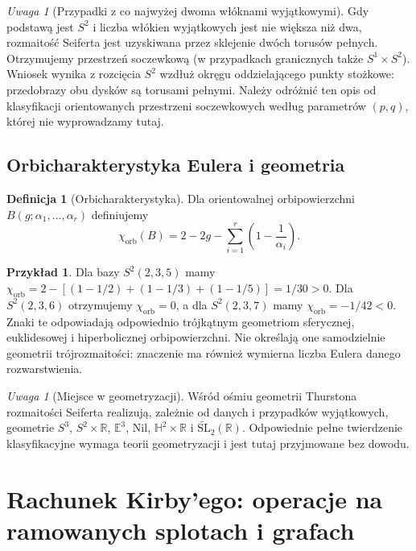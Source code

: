 \documentclass[11pt,a4paper]{report}
\numberwithin{equation}{section}
\theoremstyle{plain}
\theoremstyle{definition}
\newtheorem{definicja}[twierdzenie]{Definicja}
\newtheorem{przyklad}[twierdzenie]{Przykład}
\theoremstyle{remark}
\newtheorem{uwaga}[twierdzenie]{Uwaga}
\begin{document}
\begin{uwaga}[Przypadki z co najwyżej dwoma włóknami wyjątkowymi]
Gdy podstawą jest $S^2$ i liczba włókien wyjątkowych
jest nie większa niż dwa, rozmaitość Seiferta jest
uzyskiwana przez sklejenie dwóch torusów pełnych.
Otrzymujemy przestrzeń soczewkową (w przypadkach
granicznych także $S^1\times S^2$). Wniosek wynika
z rozcięcia $S^2$ wzdłuż okręgu oddzielającego
punkty stożkowe: przedobrazy obu dysków są torusami
pełnymi. Należy odróżnić ten opis od klasyfikacji
orientowanych przestrzeni soczewkowych według
parametrów $(p,q)$, której nie wyprowadzamy tutaj.
\end{uwaga}

\section{Orbicharakterystyka Eulera i geometria}
\label{sec:tg-seifert-orbifold}

\begin{definicja}[Orbicharakterystyka]
Dla orientowalnej orbipowierzchni
$B(g;\alpha_1,\ldots,\alpha_r)$ definiujemy
\[
\chi_{\mathrm{orb}}(B)=2-2g-
\sum_{i=1}^r\left(1-\frac1{\alpha_i}\right).
\]
\end{definicja}

\begin{przyklad}
Dla bazy $S^2(2,3,5)$ mamy
$\chi_{\mathrm{orb}}=2-[(1-1/2)+(1-1/3)+(1-1/5)]
=1/30>0$. Dla $S^2(2,3,6)$ otrzymujemy
$\chi_{\mathrm{orb}}=0$, a dla $S^2(2,3,7)$ mamy
$\chi_{\mathrm{orb}}=-1/42<0$.
Znaki te odpowiadają odpowiednio trójkątnym
geometriom sferycznej, euklidesowej i hiperbolicznej
orbipowierzchni. Nie określają one samodzielnie geometrii
trójrozmaitości: znaczenie ma również wymierna
liczba Eulera danego rozwarstwienia.
\end{przyklad}

\begin{uwaga}[Miejsce w geometryzacji]
Wśród ośmiu geometrii Thurstona rozmaitości Seiferta
realizują, zależnie od danych i przypadków wyjątkowych,
geometrie $S^3$, $S^2\times\mathbb R$, $\mathbb E^3$,
$\mathrm{Nil}$, $\mathbb H^2\times\mathbb R$
i $\widetilde{\mathrm{SL}}_2(\mathbb R)$.
Odpowiednie pełne twierdzenie klasyfikacyjne wymaga
teorii geometryzacji i jest tutaj przyjmowane bez dowodu.
\end{uwaga}

\chapter{Rachunek Kirby'ego: operacje na ramowanych splotach i grafach}
\label{ch:tg-kirby-full}
\end{document}
